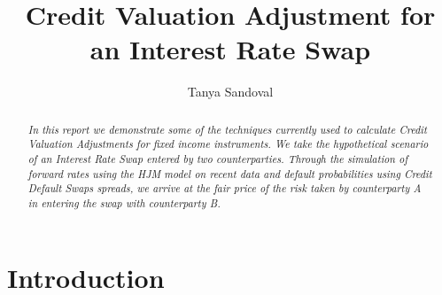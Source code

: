 \documentclass[reqno]{article}
\title{Credit Valuation Adjustment for an Interest Rate Swap}
\author{Tanya Sandoval}
\begin{document}
    \maketitle

    \begin{abstract}
    \emph{
    In this report we demonstrate some of the techniques currently used  to calculate Credit Valuation Adjustments for fixed income instruments. 
    We take the hypothetical scenario of an Interest Rate Swap entered by two counterparties. Through the simulation of forward rates using the HJM model on recent data and default probabilities using Credit Default Swaps spreads, we arrive at the fair price of the risk taken by counterparty A in entering the swap with counterparty B.
     }
    \end{abstract}


    \tableofcontents
    \newpage


    \section{Introduction}\label{cva-calculation-for-an-interest-rate-swap}
\end{document}
